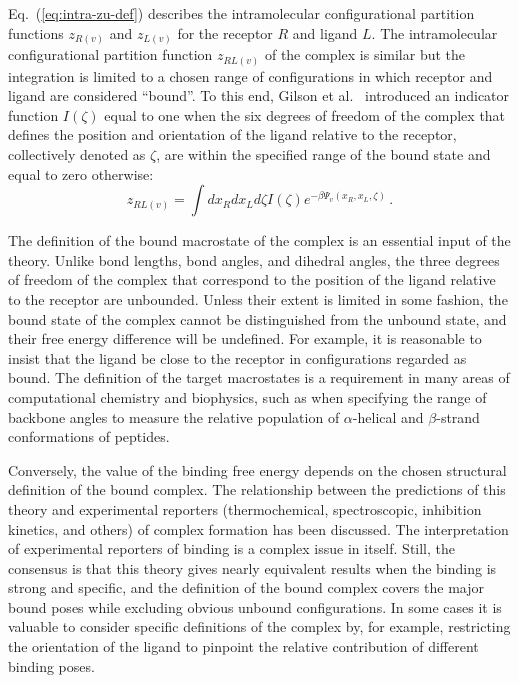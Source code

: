 \documentclass[9pt,bestpractices]{livecoms}
\begin{document}
Eq.~(\ref{eq:intra-zu-def}) describes the intramolecular configurational partition functions $z_{R(v)}$ and $z_{L(v)}$ for the receptor $R$ and ligand $L$. The intramolecular configurational partition function $z_{RL(v)}$ of the complex is similar but the integration is limited to a chosen range of configurations in which receptor and ligand are considered ``bound''. To this end, Gilson et al.~\cite{gilson1997statisticalthermodynamic} introduced an indicator function $I(\zeta)$ equal to one when the six degrees of freedom of the complex that defines the position and orientation of the ligand relative to the receptor, collectively denoted as $\zeta$, are within the specified range of the bound state and equal to zero otherwise:
\begin{equation}
  z_{RL(v)} = \int dx_R dx_L d\zeta I(\zeta) e^{-\beta \Psi_v(x_R, x_L, \zeta)} \, .
  \label{eq:intra-zRL-def}
\end{equation}

The definition of the bound macrostate of the complex is an essential input of the theory. Unlike bond lengths, bond angles, and dihedral angles, the three degrees of freedom of the complex that correspond to the position of the ligand relative to the receptor are unbounded. Unless their extent is limited in some fashion, the bound state of the complex cannot be distinguished from the unbound state, and their free energy difference will be undefined. For example, it is reasonable to insist that the ligand be close to the receptor in configurations regarded as bound. The definition of the target macrostates is a requirement in many areas of computational chemistry and biophysics, such as when specifying the range of backbone angles to measure the relative population of $\alpha$-helical and $\beta$-strand conformations of peptides.  

Conversely, the value of the binding free energy depends on the chosen structural definition of the bound complex. The relationship between the predictions of this theory and experimental reporters (thermochemical, spectroscopic, inhibition kinetics, and others) of complex formation has been discussed.\cite{gilson1997statisticalthermodynamic,mihailescu2004theory,gallicchio2011recent,simonson2016physical,gallicchio2021comppeptsci} The interpretation of experimental reporters of binding is a complex issue in itself. Still, the consensus is that this theory gives nearly equivalent results when the binding is strong and specific, and the definition of the bound complex covers the major bound poses while excluding obvious unbound configurations. In some cases it is valuable to consider specific definitions of the complex by, for example, restricting the orientation of the ligand to pinpoint the relative contribution of different binding poses.
\end{document}
